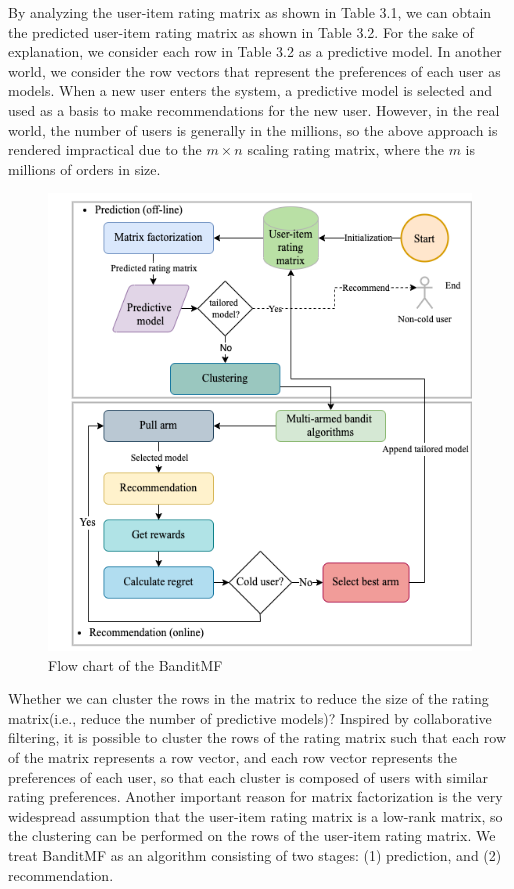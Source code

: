 By analyzing the user-item rating matrix as shown in Table 3.1, we can obtain the predicted user-item rating matrix as shown in Table 3.2.
For the sake of explanation, we consider each row in Table 3.2 as a predictive model. In another world, we consider the row vectors that represent the preferences of each user as models. When a new user enters the system, a predictive model is selected and used as a basis to make recommendations for the new user. However, in the real world, the number of users is generally in the millions, so the above approach is rendered impractical due to the $m\times n$ scaling rating matrix, where the $m$ is millions of orders in size. 

\begin{figure}[htbp]
\centering

\includegraphics[scale=0.8]{figure/fc.png}
\caption{Flow chart of the BanditMF}
\end{figure}

Whether we can cluster the rows in the matrix to reduce the size of the rating matrix(i.e., reduce the number of predictive models)? Inspired by collaborative filtering, it is possible to cluster the rows of the rating matrix such that each row of the matrix represents a row vector, and each row vector represents the preferences of each user, so that each cluster is composed of users with similar rating preferences. Another important reason for matrix factorization is the very widespread assumption that the user-item rating matrix is a low-rank matrix, so the clustering can be performed on the rows of the user-item rating matrix. We treat BanditMF as an algorithm consisting of two stages: (1) prediction, and (2) recommendation.

